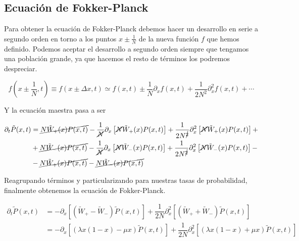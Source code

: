 \subsection{Ecuación de Fokker-Planck}


Para obtener la ecuación de Fokker-Planck debemos hacer un desarrollo en serie a segundo orden en torno a los puntos $x\pm \frac{1}{N}$ de la nueva función $f$ que hemos definido. Podemos 
aceptar el desarrollo a segundo orden siempre que tengamos una población grande, ya que hacemos el resto de términos los podremos despreciar.

$$f\left(  x\pm \frac{1}{N},t \right)\equiv f\left( x\pm \Delta x,t\right)\simeq f(x,t)\pm \dfrac{1}{N}\partial_x f(x,t)+\dfrac{1}{2N^2}\partial^2_xf(x,t)+\cdots$$

Y la ecuación maestra pasa a ser

\begin{equation}
    \begin{split}
        \partial_t \tilde{P}(x,t)&=\cancel{N\tilde{W}_{+}(x)P(x,t)}-\dfrac{1}{\cancel{N}}\partial_x\left[\cancel{N}\tilde{W}_{+}(x)P(x,t) \right]+\dfrac{1}{2N^{\cancel{2}}}\partial^2_x\left[ \cancel{N}\tilde{W}_{+}(x)P(x,t) \right]+\\
        &+ \cancel{N\tilde{W}_{-}(x)P(x,t)}-\dfrac{1}{\cancel{N}}\partial_x\left[\cancel{N}\tilde{W}_{-}(x)P(x,t) \right]+\dfrac{1}{2N^{\cancel{2}}}\partial^2_x\left[ \cancel{N}\tilde{W}_{-}(x)P(x,t) \right]-\\
        &-\cancel{N\tilde{W}_{+}(x)P(x,t)}-\cancel{N\tilde{W}_{-}(x)P(x,t)}
    \end{split}
\end{equation}

Reagrupando términos y particularizando para nuestras tasas de probabilidad, finalmente obtenemos la ecuación de Fokker-Planck.

\begin{equation}
    \begin{split}
        \partial_t\tilde{P}(x,t)&=-\partial_x\left[ \left( \tilde{W}_{+}-\tilde{W}_{-} \right)\tilde{P}(x,t) \right]+ \dfrac{1}{2N}\partial_x^2\left[ \left( \tilde{W}_{+}+\tilde{W}_{-} \right)\tilde{P}(x,t) \right]\\
        &=-\partial_x\left[ \left( \lambda x (1-x)-\mu x\right)\tilde{P}(x,t) \right]+\dfrac{1}{2N}\partial_x^2\left[ \left( \lambda x (1-x)+\mu x\right)\tilde{P}(x,t) \right]
    \end{split}
    \label{eq:ecuación de Fokker Planck}
\end{equation}

